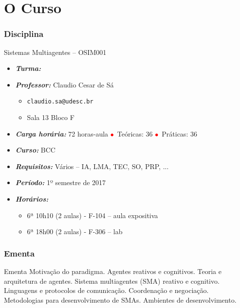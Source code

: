 
\section{O Curso}
\begin{frame}


\frametitle{Disciplina}

\begin{block}{Sistemas Multiagentes -- OSIM001}

\begin{itemize}
\item \emph{\textbf{Turma:}} 
\item \emph{\textbf{Professor:}} Claudio Cesar de Sá
  \begin{itemize}
  \item \texttt{claudio.sa@udesc.br}
  \item Sala 13 Bloco F
  \end{itemize}
\item \emph{\textbf{Carga horária:}} 72 horas-aula 
\textcolor{red}{$\bullet$}~Teóricas: 36 \textcolor{red}{$\bullet$}~Práticas: 36
\item \emph{\textbf{Curso:}} BCC
\item \emph{\textbf{Requisitos:}} Vários -- IA, LMA, TEC, SO, PRP, ...
\item \emph{\textbf{Período:}} 1º semestre de 2017
\item \emph{\textbf{Horários:}}
  \begin{itemize}
  \item 6ª 10h10 (2 aulas) - F-104  -- aula expositiva
  \item 6ª 18h00 (2 aulas) - F-306 -- lab
  
  \end{itemize}

\end{itemize}

\end{block}

\end{frame}


\begin{frame}
\frametitle{Ementa}

\begin{block}{Ementa}
 Motivação do paradigma. Agentes reativos e cognitivos. Teoria e arquitetura de agentes. Sistema multiagentes (SMA) reativo e cognitivo. Linguagens e protocolos de comunicação. Coordenação e negociação. Metodologias para desenvolvimento de SMAs. Ambientes de desenvolvimento.

\end{block}

\end{frame}

